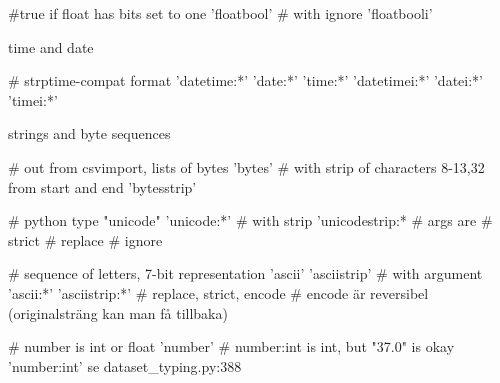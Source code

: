 \begin{python}
#true if float has bits set to one
'floatbool'
# with ignore
'floatbooli'   
\end{python}

time and date
\begin{python}
# strptime-compat format
    'datetime:*'   
    'date:*'       
    'time:*'       
    'datetimei:*'  
    'datei:*'      
    'timei:*'      
\end{python}

strings and byte sequences
\begin{python}
# out from csvimport, lists of bytes
'bytes'
# with strip of characters 8-13,32 from start and end
'bytesstrip'
\end{python}

\begin{python}
# python type "unicode"
'unicode:*'    
# with strip
'unicodestrip:*
# args are
#   strict
#   replace
#   ignore
\end{python}

\begin{python}
# sequence of letters, 7-bit representation
    'ascii'        
    'asciistrip'   
# with argument
    'ascii:*'      
    'asciistrip:*' 
# replace, strict, encode
# encode är reversibel (originalsträng kan man få tillbaka)
\end{python}

\begin{python}
# number is int or float
    'number'       
# number:int is int, but "37.0" is okay
    'number:int'  se dataset_typing.py:388
\end{python}



